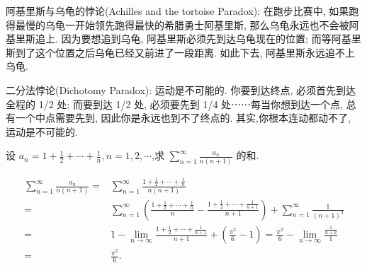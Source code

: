 \documentclass[color=green,titlestyle=hang]{elegantbook}%
\begin{document}

\par 阿基里斯与乌龟的悖论(Achilles and the tortoise Paradox): 在跑步比赛中, 如果跑得最慢的乌龟一开始领先跑得最快的希腊勇士阿基里斯, 那么乌龟永远也不会被阿基里斯追上. 因为要想追到乌龟, 阿基里斯必须先到达乌龟现在的位置; 而等阿基里斯到了这个位置之后乌龟已经又前进了一段距离. 如此下去, 阿基里斯永远追不上乌龟.

\par 二分法悖论(Dichotomy Paradox): 运动是不可能的. 你要到达终点, 必须首先到达全程的 1/2 处; 而要到达 1/2 处, 必须要先到 1/4 处⋯⋯每当你想到达一个点, 总有一个中点需要先到, 因此你是永远也到不了终点的. 其实,你根本连动都动不了, 运动是不可能的.

\begin{example}
设 ${a_n} = 1 + \frac{1}{2} + \cdots + \frac{1}{n},n = 1,2, \cdots$,求 $\sum\limits_{n = 1}^\infty {\frac{{{a_n}}}{{n\left( {n + 1} \right)}}}$ 的和.
\end{example}\begin{solution}
\begin{align*}
\sum\limits_{n = 1}^\infty {\frac{{{a_n}}}{{n\left( {n + 1} \right)}}} =& \sum\limits_{n = 1}^\infty {\frac{{1 + \frac{1}{2} + \cdots + \frac{1}{n}}}{{n\left( {n + 1} \right)}}} \\
=&\sum\limits_{n = 1}^\infty {\left( {\frac{{1 + \frac{1}{2} + \cdots + \frac{1}{n}}}{n} - \frac{{1 + \frac{1}{2} + \cdots + \frac{1}{{n + 1}}}}{{n + 1}}} \right)} + \sum\limits_{n = 1}^\infty {\frac{1}{{{{\left( {n + 1} \right)}^2}}}} \\
= & 1 - \mathop {\lim }\limits_{n \to \infty } \frac{{1 + \frac{1}{2} + \cdots + \frac{1}{{n + 1}}}}{{n + 1}} + \left( {\frac{{{\pi ^2}}}{6} - 1} \right) = \frac{{{\pi ^2}}}{6} - \mathop {\lim }\limits_{n \to \infty } \frac{{\frac{1}{{n + 2}}}}{1} \\
=& \frac{{{\pi ^2}}}{6}.
\end{align*}
\end{solution}
\end{document}
